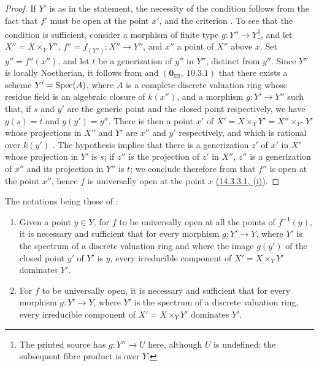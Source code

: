 \begin{proof}
If $Y'$ is as in the statement, the necessity of the condition follows from the fact that $f'$ must be open at the point $x'$, and the criterion .
To see that the condition is sufficient, consider a morphism of finite type $g:Y''\to Y$\footnote{The printed source has $g:Y''\to U$ here, although $U$ is undefined; the subsequent fibre product is over $Y$.}, and let $X''=X\times_Y Y''$, $f''=f_{(Y'')}:X''\to Y''$, and $x''$ a point of $X''$ above $x$.
Set $y''=f''(x'')$, and let $t$ be a generization of $y''$ in $Y''$, distinct from $y''$.
Since $Y''$ is locally Noetherian, it follows from  and $(\mathbf{0}_{\mathrm{III}},~10.3.1)$ that there exists a scheme $Y'=\operatorname{Spec}(A)$, where $A$ is a complete discrete valuation ring whose residue field is an algebraic closure of $k(x'')$, and a morphism $g:Y'\to Y''$ such that, if $s$ and $y'$ are the generic point and the closed point respectively, we have $g(s)=t$ and $g(y')=y''$.
There is then a point $x'$ of $X'=X\times_Y Y'=X''\times_{Y''}Y'$ whose projections in $X''$ and $Y'$ are $x''$ and $y'$ respectively, and which is rational over $k(y')$ .
The hypothesis implies that there is a generization $z'$ of $x'$ in $X'$ whose projection in $Y'$ is $s$; if $z''$ is the projection of $z'$ in $X''$, $z''$ is a generization of $x''$ and its projection in $Y''$ is $t$; we conclude therefore from  that $f''$ is open at the point $x''$, hence $f$ is universally open at the point $x$ {\hyperref[IV.14.3.3.1]{(14.3.3.1, (i))}}.
\end{proof}

\begin{corollary}[14.3.7]
\label{IV.14.3.7}
The notations being those of :
\begin{enumerate}[label=(\roman*)]
  \item Given a point $y\in Y$, for $f$ to be universally open at all the points of $f^{-1}(y)$, it is necessary and sufficient that for every morphism $g:Y'\to Y$, where $Y'$ is the spectrum of a discrete valuation ring and where the image $g(y')$ of the closed point $y'$ of $Y'$ is $y$, every irreducible component of $X'=X\times_Y Y'$ dominates $Y'$.
  \item For $f$ to be universally open, it is necessary and sufficient that for every morphism $g:Y'\to Y$, where $Y'$ is the spectrum of a discrete valuation ring, every irreducible component of $X'=X\times_Y Y'$ dominates $Y'$.
\end{enumerate}
\end{corollary}


